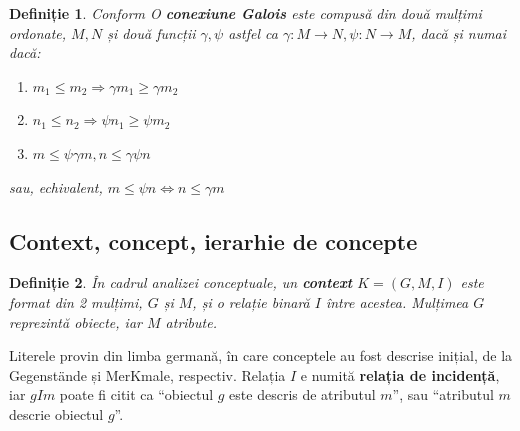 \documentclass[12pt, a4paper, twoside, romanian]{teza-upb}
\newtheorem{defn}{Definiție}
\begin{document}
    \begin{defn}
      Conform \cite{Carpineto:2004:CDA:975252} O \textbf{conexiune Galois} este compusă din două mulțimi ordonate, $M, N$ și două funcții $\gamma, \psi$ astfel ca $ \gamma: M \rightarrow N, \psi : N \rightarrow M$, dacă și numai dacă:
    \begin{enumerate}
      \item $m_1 \le m_2 \Rightarrow  \gamma m_1 \ge \gamma m_2$
      \item $n_1 \le n_2 \Rightarrow \psi n_1 \ge \psi m_2$
      \item $m \le \psi \gamma m,  n \le \gamma\psi n $
    \end{enumerate}
    sau, echivalent, $m \le \psi n \Leftrightarrow n \le \gamma m$
    \end{defn}

    \subsection{Context, concept, ierarhie de concepte}
    \begin{defn}
      În cadrul analizei conceptuale, un \textbf{context} $K = (G, M, I)$ este format din 2 mulțimi, $G$ și $M$, și o relație binară $I$ între acestea. Mulțimea $G$ reprezintă obiecte, iar $M$ atribute.
    \end{defn}

      Literele provin din limba germană, în care conceptele au fost descrise inițial, de la Gegenstände și MerKmale, respectiv. Relația $I$ e numită \textbf{relația de incidență}, iar $gIm$ poate fi citit ca ``obiectul $g$ este descris de atributul $m$'', sau ``atributul $m$ descrie obiectul $g$''.
\end{document}
